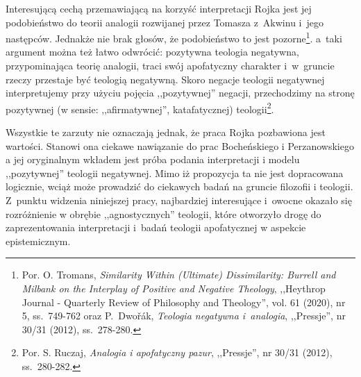 Interesującą cechą przemawiającą na korzyść interpretacji Rojka jest jej podobieństwo
do teorii analogii rozwijanej przez Tomasza z~Akwinu i~jego następców. Jednakże nie brak
głosów, że podobieństwo to jest pozorne\footnote{Por.
O. Tromans, \textit{Similarity Within (Ultimate) Dissimilarity: Burrell and Milbank on the Interplay of Positive and Negative Theology}, ,,Heythrop Journal - Quarterly Review of Philosophy and Theology'', vol. 61 (2020), nr 5, ss.~749-762
oraz
P.~Dwořák, \textit{Teologia negatywna i~analogia}, ,,Pressje'', nr 30/31 (2012),
ss.~278-280.}.
a~taki argument można też łatwo odwrócić: pozytywna teologia negatywna,
przypominająca teorię analogii, traci swój apofatyczny charakter i~w~gruncie rzeczy przestaje być teologią negatywną.
Skoro negacje teologii negatywnej interpretujemy przy
użyciu pojęcia ,,pozytywnej'' negacji, przechodzimy na stronę
pozytywnej (w sensie: ,,afirmatywnej'', katafatycznej) teologii\footnote{Por. S.
Ruczaj, \textit{Analogia i apofatyczny pazur}, ,,Pressje'', nr 30/31 (2012),
ss.~280-282.}.

Wszystkie te zarzuty nie oznaczają jednak, że praca Rojka pozbawiona jest
wartości. Stanowi ona ciekawe nawiązanie do prac Bocheńskiego i Perzanowskiego a jej oryginalnym wkładem jest
próba podania interpretacji i modelu ,,pozytywnej'' teologii negatywnej. Mimo iż propozycja ta nie jest dopracowana logicznie, wciąż może prowadzić do ciekawych badań na gruncie filozofii i teologii. Z~punktu widzenia
niniejszej pracy, najbardziej interesujące i~owocne okazało się rozróżnienie w obrębie ,,agnostycznych'' teologii, które otworzyło drogę do zaprezentowania interpretacji i~badań teologii apofatycznej w aspekcie epistemicznym.


